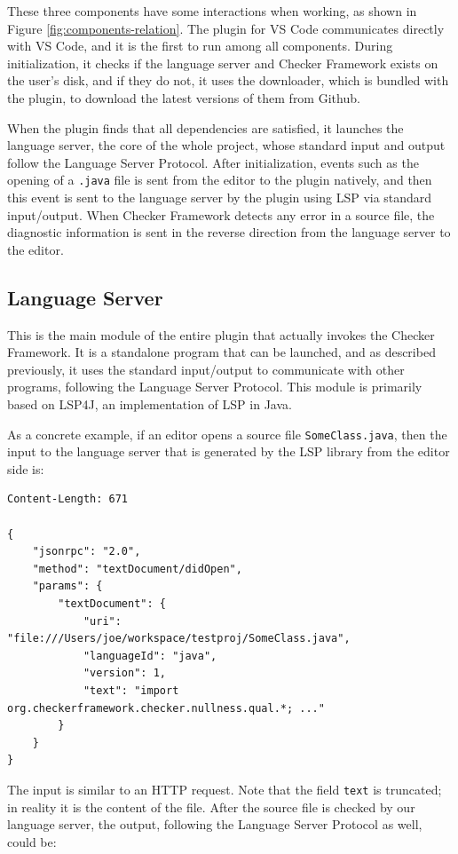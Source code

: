 \documentclass{article}
\begin{document}
These three components have some interactions when working, as shown in Figure \ref{fig:components-relation}.  The plugin for VS Code communicates directly with VS Code, and it is the first to run among all components.  During initialization, it checks if the language server and Checker Framework exists on the user's disk, and if they do not, it uses the downloader, which is bundled with the plugin, to download the latest versions of them from Github.

When the plugin finds that all dependencies are satisfied, it launches the language server, the core of the whole project, whose standard input and output follow the Language Server Protocol.  After initialization, events such as the opening of a \verb|.java| file is sent from the editor to the plugin natively, and then this event is sent to the language server by the plugin using LSP via standard input/output.  When Checker Framework detects any error in a source file, the diagnostic information is sent in the reverse direction from the language server to the editor.

\subsection{Language Server}

This is the main module of the entire plugin that actually invokes the Checker Framework. It is a standalone program that can be launched, and as described previously, it uses the standard input/output to communicate with other programs, following the Language Server Protocol. This module is primarily based on LSP4J\cite{lsp4j}, an implementation of LSP in Java.

As a concrete example, if an editor opens a source file \verb|SomeClass.java|, then the input to the language server that is generated by the LSP library from the editor side is:

\begin{lstlisting}
Content-Length: 671

{
    "jsonrpc": "2.0",
    "method": "textDocument/didOpen",
    "params": {
        "textDocument": {
            "uri": "file:///Users/joe/workspace/testproj/SomeClass.java",
            "languageId": "java",
            "version": 1,
            "text": "import org.checkerframework.checker.nullness.qual.*; ..."
        }
    }
}
\end{lstlisting}

The input is similar to an HTTP request. Note that the field \verb|text| is truncated; in reality it is the content of the file. After the source file is checked by our language server, the output, following the Language Server Protocol as well, could be:
\end{document}
